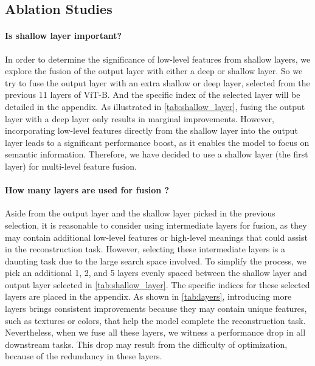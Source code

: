 \subsection{Ablation Studies}
\label{sec:ablation}
\paragraph{Is shallow layer important?} In order to determine the significance of low-level features from shallow layers, we explore the fusion of the output layer with either a deep or shallow layer. So we try to fuse the output layer with an extra shallow or deep layer, selected from the previous 11 layers of ViT-B\cite{ViT}. And the specific index of the selected layer will be detailed in the appendix. As illustrated in \autoref{tab:shallow_layer}, fusing the output layer with a deep layer only results in marginal improvements. However, incorporating low-level features directly from the shallow layer into the output layer leads to a significant performance boost, as it enables the model to focus on semantic information. Therefore, we have decided to use a shallow layer (\ie the first layer) for multi-level feature fusion.

\paragraph{How many layers are used for fusion ?} Aside from the output layer and the shallow layer picked in the previous selection, it is reasonable to consider using intermediate layers for fusion, as they may contain additional low-level features or high-level meanings that could assist in the reconstruction task. However, selecting these intermediate layers is a daunting task due to the large search space involved. To simplify the process, we pick an additional 1, 2, and 5 layers evenly spaced between the shallow layer and output layer selected in \autoref{tab:shallow_layer}. The specific indices for these selected layers are placed in the appendix. As shown in \autoref{tab:layers}, introducing more layers brings consistent improvements because they may contain unique features, such as textures or colors, that help the model complete the reconstruction task. Nevertheless, when we fuse all these layers, we witness a performance drop in all downstream tasks. This drop may result from the difficulty of optimization, because of the redundancy in these layers.



